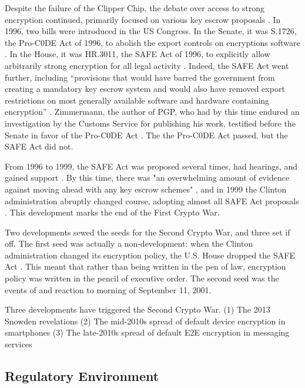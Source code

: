 Despite the failure of the Clipper Chip, the debate over access to strong encryption continued, primarily focused on
various key escrow proposals \cite{thompson_2015}. In 1996, two bills were introduced in the US Congress. In the Senate,
it was S.1726, the Pro-C0DE Act of 1996, to abolish the export controls on encryptions software \cite{burns_s1726_1996}.
In the House, it was HR.3011, the SAFE Act of 1996, to explicitly allow arbitrarily strong encryption for all legal
activity \cite{goodlatte_hr3011_1996}. Indeed, the SAFE Act went further, including ``provisions that would have
barred the government from creating a mandatory key escrow system and would also have removed export restrictions on
most generally available software and hardware containing encryption'' \cite{kehl_right_2015}. Zimmermann, the author of
PGP, who had by this time endured an investigation by the Customs Service for publishing his work, testified before the
Senate in favor of the Pro-C0DE Act \cite{zimmermann_1996}. The the Pro-C0DE Act passed, but the SAFE Act did not.

From 1996 to 1999, the SAFE Act was proposed several times, had hearings, and gained support \cite{kehl_right_2015}. By
this time, there was "an overwhelming amount of evidence against moving ahead with any key escrow schemes"
\cite{thompson_2015}, and in 1999 the Clinton administration abruptly changed course, adopting almost all SAFE Act
proposals \cite{kehl_right_2015}. This development marks the end of the First Crypto War.

Two developments sewed the seeds for the Second Crypto War, and three set if off. The first seed was actually a
non-development: when the Clinton administration changed its encryption policy, the U.S. House dropped the SAFE Act
\cite{kehl_right_2015}. This meant that rather than being written in the pen of law, encryption policy was written in
the pencil of executive order. The second seed was the events of and reaction to morning of September 11, 2001.

Three developments have triggered the Second Crypto War.
(1) The 2013 Snowden revelations
(2) The mid-2010s spread of default device encryption in smartphones
(3) The late-2010s spread of default E2E encryption in messaging services

\subsection{Regulatory Environment}
\label{sec-reg-environment}

